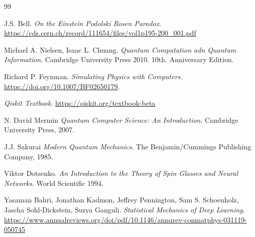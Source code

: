 \documentclass[a4paper]{article}
\begin{document}
\begin{thebibliography}{99}

 J.S. Bell. \textit{On the Einstein Podolski Rosen Paradox}. \url{https://cds.cern.ch/record/111654/files/vol1p195-200_001.pdf}

 Michael A. Nielsen, Isaac L. Chuang. \textit{Quantum Computation adn Quantum Information}. Cambridge University Press 2010. 10th. Anniversary Edition.

 Richard P. Feynman. \textit{Simulating Physics with Computers.} \url{https://doi.org/10.1007/BF02650179}.

 \textit{Qiskit Textbook}. \url{https://qiskit.org/textbook-beta}

 N. David Mermin \textit{Quantum Computer Science: An Introduction}. Cambridge University Press, 2007.

 J.J. Sakurai \textit{Modern Quantum Mechanics}. The Benjamin/Cummings Publishing Company, 1985.

 Viktor Dotsenko. \textit{An Introduction to the Theory of Spin Glasses and Neural Networks}. World Scientific 1994.

 Yasaman Bahri, Jonathan Kadmon, Jeffrey Pennington, Sam S. Schoenholz, Jascha Sohl-Dickstein, Surya Ganguli. \textit{Statistical Mechanics of Deep Learning}. \url{https://www.annualreviews.org/doi/pdf/10.1146/annurev-conmatphys-031119-050745}






\end{thebibliography}
\end{document}
